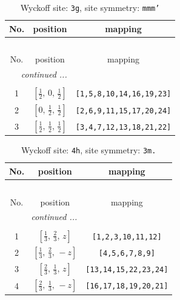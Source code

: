 \documentclass[fleqn,8pt]{jsarticle}
\begin{document}
\begin{longtable}{ccc}
\caption{Wyckoff site: {\tt 3g}, site symmetry: {\tt mmm'}}
 \\
 \hline \hline
No. & position & mapping \\ \hline \endfirsthead

\multicolumn{2}{l}{\tablename\ \thetable{}} \\
 \hline \hline
No. & position & mapping \\ \hline \endhead

 \hline \hline
\multicolumn{2}{r}{\footnotesize\it continued ...} \\ \endfoot

 \hline \hline
\multicolumn{2}{r}{} \\ \endlastfoot

1 & $\left[ \frac{1}{2},\, 0,\, \frac{1}{2} \right]$ & {\tt [1,5,8,10,14,16,19,23]} \\ \hline
2 & $\left[ 0,\, \frac{1}{2},\, \frac{1}{2} \right]$ & {\tt [2,6,9,11,15,17,20,24]} \\ \hline
3 & $\left[ \frac{1}{2},\, \frac{1}{2},\, \frac{1}{2} \right]$ & {\tt [3,4,7,12,13,18,21,22]} \\
\end{longtable}
\renewcommand{\arraystretch}{1.2}
\begin{longtable}{ccc}
\caption{Wyckoff site: {\tt 4h}, site symmetry: {\tt 3m.}}
 \\
 \hline \hline
No. & position & mapping \\ \hline \endfirsthead

\multicolumn{2}{l}{\tablename\ \thetable{}} \\
 \hline \hline
No. & position & mapping \\ \hline \endhead

 \hline \hline
\multicolumn{2}{r}{\footnotesize\it continued ...} \\ \endfoot

 \hline \hline
\multicolumn{2}{r}{} \\ \endlastfoot

1 & $\left[ \frac{1}{3},\, \frac{2}{3},\, z \right]$ & {\tt [1,2,3,10,11,12]} \\ \hline
2 & $\left[ \frac{1}{3},\, \frac{2}{3},\, - z \right]$ & {\tt [4,5,6,7,8,9]} \\ \hline
3 & $\left[ \frac{2}{3},\, \frac{1}{3},\, z \right]$ & {\tt [13,14,15,22,23,24]} \\ \hline
4 & $\left[ \frac{2}{3},\, \frac{1}{3},\, - z \right]$ & {\tt [16,17,18,19,20,21]} \\
\end{longtable}
\end{document}
